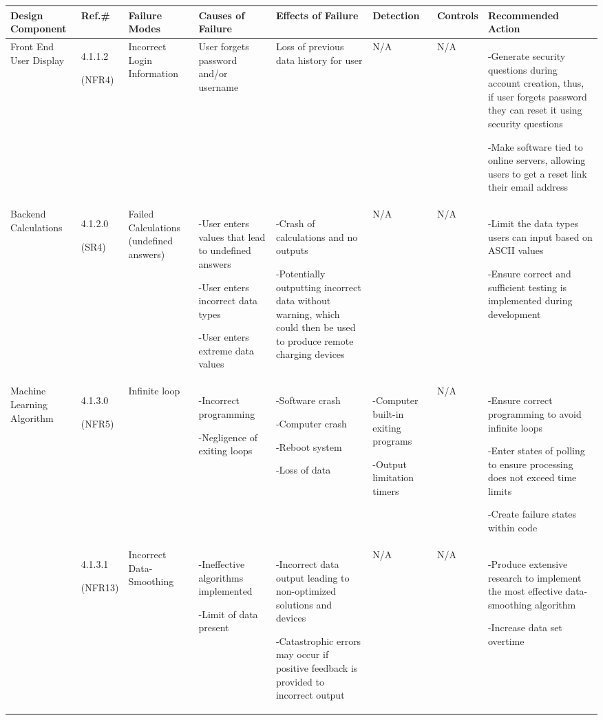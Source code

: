 \documentclass[12pt, titlepage]{article}
\begin{document}
\begin{center}
\begin{adjustwidth}{-3.5cm}{}
\begin{tabular}{|p{1.5cm}|p{1.4cm}|p{1.8cm}|p{2cm}|p{3.5cm}|p{1.7cm}|p{1.5cm}|p{4.2cm}|}
\hline
Design Component & Ref.\# & Failure Modes & Causes of Failure & Effects of Failure & Detection & Controls & Recommended Action\\
\hline
Front End User Display & 4.1.1.2 \par(NFR4)& Incorrect Login Information & User forgets password and/or username & Loss of previous data history for user & N/A & N/A & -Generate security questions during account creation, thus, if user forgets password they can reset it using security questions \par -Make software tied to online servers, allowing users to get a reset link their email address\\
 \hline
 Backend Calculations & 4.1.2.0 \par(SR4)& Failed Calculations (undefined answers) & -User enters values that lead to undefined answers \par -User enters incorrect data types \par -User enters extreme data values & -Crash of calculations and no outputs \par -Potentially outputting incorrect data without warning, which could then be used to produce remote charging devices & N/A & N/A & -Limit the data types users can input based on ASCII values \par -Ensure correct and sufficient testing is implemented during development\\
 \hline
 Machine Learning Algorithm & 4.1.3.0  \par (NFR5)& Infinite loop & -Incorrect programming \par -Negligence of exiting loops & -Software crash \par -Computer crash \par -Reboot system \par -Loss of data & -Computer built-in exiting programs \par -Output limitation timers & N/A & -Ensure correct programming to avoid infinite loops \par -Enter states of polling to ensure processing does not exceed time limits \par -Create failure states within code\\
 & 4.1.3.1 \par(NFR13) & Incorrect Data-Smoothing & -Ineffective algorithms implemented \par -Limit of data present & -Incorrect data output leading to non-optimized solutions and devices \par -Catastrophic errors may occur if positive feedback is provided to incorrect output & N/A & N/A & -Produce extensive research to implement the most effective data-smoothing algorithm \par -Increase data set overtime \\
 \hline
\end{tabular}
\end{adjustwidth}
\end{center}
\end{document}
